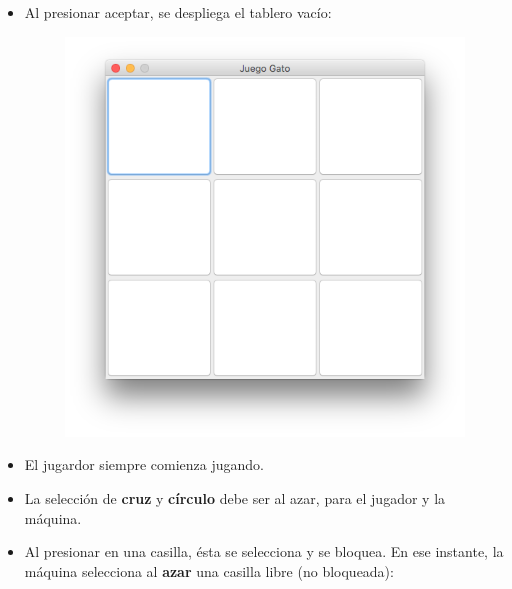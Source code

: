 \documentclass[10pt]{article}
\begin{document}
{\begin{enumerate}
\begin{itemize}
    \item Al presionar aceptar, se despliega el tablero vac\'io:
    
    \begin{figure}[H]
        \begin{center}
            \includegraphics[scale=.5]{img_inicio.png}
        \end{center}
    \end{figure}
    
    \item El jugardor siempre comienza jugando.

    \item La selecci\'on de \textbf{cruz} y \textbf{c\'irculo} debe ser al azar, para el jugador y la m\'aquina.

    \item Al presionar en una casilla, \'esta se selecciona y se bloquea. En ese instante, la m\'aquina selecciona al \textbf{azar} una casilla libre (no bloqueada):
    

\end{itemize}
\end{enumerate}}
\end{document}
